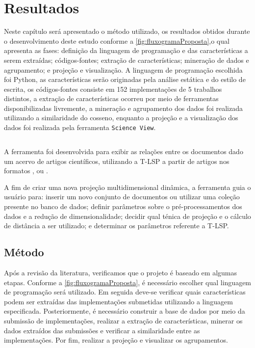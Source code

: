 \chapter{Resultados}
\label{chap:Result}

	Neste capítulo será apresentado o método utilizado, os resultados obtidos durante
	o desenvolvimento deste estudo conforme a \cref{fig:fluxogramaProposta},o qual
	apresenta as fases: definição da linguagem de programação e das características
	a serem extraídas; códigos-fontes; extração de características; mineração de dados e
	agrupamento; e projeção e visualização. A linguagem de programação escolhida foi Python,
	as características serão originadas pela análise estática e do estilo de escrita,
	os códigos-fontes consiste em 152 implementações de 5 trabalhos distintos, a extração
	de características ocorreu por meio de ferramentas disponibilizadas livremente, a
	mineração e agrupamento dos dados foi realizada utilizando a similaridade do
	cosseno, enquanto a projeção e a visualização dos dados foi realizada pela ferramenta
	\texttt{Science View}.
	 
	\section{}
		A ferramenta  \cite{Alencar} foi desenvolvida para exibir
		as relações entre os documentos dado um acervo de artigos científicos, utilizando
		a \acs{T-LSP} a partir de artigos nos formatos , 
		ou .
		
		A fim de criar uma nova projeção multidimensional dinâmica, a ferramenta guia o usuário
		para: inserir um novo conjunto de documentos ou utilizar uma coleção presente no banco
		de dados; definir parâmetros sobre o pré-processamentos dos dados e a redução de
		dimensionalidade; decidir qual ténica de projeção e o cálculo de distância a ser utilizado;
		e determinar os parâmetros referente a \acs{T-LSP}.


 	\section{Método}
	 	Após a revisão da literatura, verificamos que o projeto é baseado em algumas etapas.
	 	Conforme a \cref{fig:fluxogramaProposta}, é necessário escolher qual linguagem de programação
	 	será utilizado. Em seguida deve-se verificar quais características podem ser extraídas
	 	das implementações submetidas utilizando a linguagem especificada. Posteriormente, é
	 	necessário construir a base de dados por meio da submissão de implementações, realizar
	 	a extração de características, minerar os dados extraídos das submissões e verificar a
	 	similaridade entre as implementações. Por fim, realizar a projeção e visualizar os
	 	agrupamentos.
	 	
